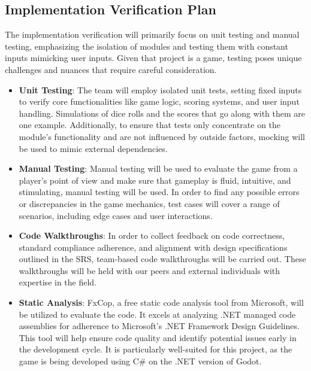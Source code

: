 \documentclass[12pt, titlepage]{article}
\begin{document}
\subsection{Implementation Verification Plan}




\noindent The implementation verification will primarily focus on unit testing and manual testing, emphasizing the isolation of modules and testing them with constant inputs mimicking user inputs. Given that project is a game, testing poses unique challenges and nuances that require careful consideration.

\begin{itemize}
  \item \textbf{Unit Testing}: The team will employ isolated unit tests, setting fixed inputs to verify core functionalities like game logic, scoring systems, and user input handling.  Simulations of dice rolls and the scores that go along with them are one example. Additionally,  to ensure that tests only concentrate on the module's functionality and are not influenced by outside factors, mocking will be used to mimic external dependencies.
  \item \textbf{Manual Testing}: Manual testing will be used to evaluate the game from a player's point of view and make sure that gameplay is fluid, intuitive, and stimulating, manual testing will be used. In order to find any possible errors or discrepancies in the game mechanics, test cases will cover a range of scenarios, including edge cases and user interactions.
  \item \textbf{Code Walkthroughs}: In order to collect feedback on code correctness, standard compliance adherence, and alignment with design specifications outlined in the SRS, team-based code walkthroughs will be carried out. These walkthroughs will be held with our peers and external individuals with expertise in the field.
  \item \textbf{Static Analysis}: FxCop, a free static code analysis tool from Microsoft, will be utilized to evaluate the code. It excels at analyzing .NET managed code assemblies for adherence to Microsoft's .NET Framework Design Guidelines. This tool will help ensure code quality and identify potential issues early in the development cycle. It is particularly well-suited for this project, as the game is being developed using C\# on the .NET version of Godot.
\end{itemize}
\end{document}
